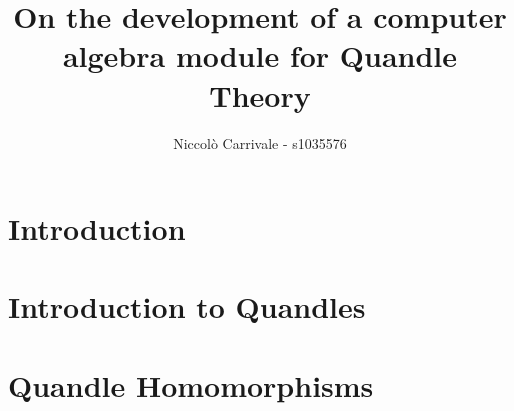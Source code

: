 \documentclass{mcom-l}
\begin{document}
\title{On the development of a computer algebra module for Quandle Theory}

\author{Niccolò Carrivale - s1035576}

\maketitle






\section{Introduction}


\section{Introduction to Quandles}


\section{Quandle Homomorphisms}





\end{document}
